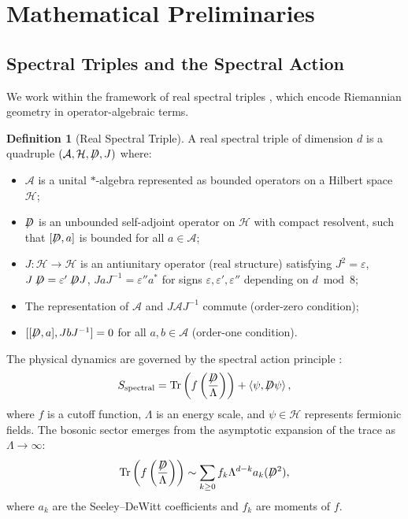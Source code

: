 \documentclass[12pt, a4paper]{article}
\theoremstyle{definition}
\newtheorem{definition}[theorem]{Definition}
\newcommand{\cA}{\mathcal{A}}
\newcommand{\cH}{\mathcal{H}}
\newcommand{\notD}{\not\!\!D}
\newcommand{\eps}{\varepsilon}
\newcommand{\inner}[2]{\left\langle #1, #2 \right\rangle}
\begin{document}
\section{Mathematical Preliminaries}
\label{sec:prelim}

\subsection{Spectral Triples and the Spectral Action}
We work within the framework of real spectral triples \cite{connes}, which encode Riemannian geometry in operator-algebraic terms.

\begin{definition}[Real Spectral Triple]
A real spectral triple of dimension $d$ is a quadruple $(\cA, \cH, \notD, J)$ where:
\begin{itemize}
    \item $\cA$ is a unital $*$-algebra represented as bounded operators on a Hilbert space $\cH$;
    \item $\notD$ is an unbounded self-adjoint operator on $\cH$ with compact resolvent, such that $[\notD, a]$ is bounded for all $a \in \cA$;
    \item $J: \cH \to \cH$ is an antiunitary operator (real structure) satisfying $J^2 = \eps$, $J\notD = \eps' \notD J$, $JaJ^{-1} = \eps'' a^*$ for signs $\eps,\eps',\eps''$ depending on $d \bmod 8$;
    \item The representation of $\cA$ and $J\cA J^{-1}$ commute (order-zero condition);
    \item $[[\notD, a], JbJ^{-1}] = 0$ for all $a,b \in \cA$ (order-one condition).
\end{itemize}
\end{definition}

The physical dynamics are governed by the spectral action principle \cite{chamseddine}:
\begin{equation}
S_{\rm spectral} = \Tr\left(f\left(\frac{\notD}{\Lambda}\right)\right) + \inner{\psi}{\notD\psi},
\label{eq:spectral-action}
\end{equation}
where $f$ is a cutoff function, $\Lambda$ is an energy scale, and $\psi \in \cH$ represents fermionic fields. The bosonic sector emerges from the asymptotic expansion of the trace as $\Lambda \to \infty$:
\begin{equation}
\Tr\left(f\left(\frac{\notD}{\Lambda}\right)\right) \sim \sum_{k \geq 0} f_k \Lambda^{d-k} a_k(\notD^2),
\label{eq:heat-kernel}
\end{equation}
where $a_k$ are the Seeley--DeWitt coefficients and $f_k$ are moments of $f$.
\end{document}
